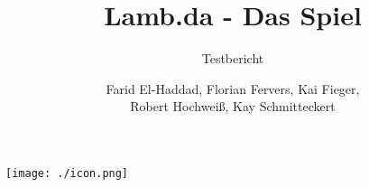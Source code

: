 \documentclass[parskip=full]{scrartcl}
\title{Lamb.da - Das Spiel}
\subtitle{Testbericht}
\author{
Farid El-Haddad,  Florian Fervers,  Kai Fieger,
\\
Robert Hochweiß, Kay Schmitteckert
}
\begin{document}
	\maketitle
	\begin{center}
	\texttt{[image: ./icon.png]}
	\end{center}

	\newpage
	\sloppy
	\tableofcontents
	\fussy
	\newpage
	
	\newpage
	
	\newpage
	
	\newpage
	
	\newpage
	
	\newpage
	
	\newpage
	
	\newpage
	
	\newpage
	
	\newpage
	
\end{document}
